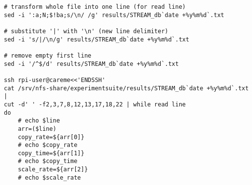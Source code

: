 \begin{verbatim}
# transform whole file into one line (for read line)                                                                                                                       
sed -i ':a;N;$!ba;s/\n/ /g' results/STREAM_db`date +%y%m%d`.txt

# substitute '|' with '\n' (new line delimiter)                                                                                                                            
sed -i 's/|/\n/g' results/STREAM_db`date +%y%m%d`.txt

# remove empty first line                                                                                                                                                  
sed -i '/^$/d' results/STREAM_db`date +%y%m%d`.txt

ssh rpi-user@careme<<'ENDSSH'                                                                                                                                               
cat /srv/nfs-share/experimentsuite/results/STREAM_db`date +%y%m%d`.txt | 
cut -d' ' -f2,3,7,8,12,13,17,18,22 | while read line                                                    
do                                                                                                                                                                          
    # echo $line                                                                                                                                                            
    arr=($line)                                                                                                                                                            
    copy_rate=${arr[0]}                                                                                                                                                     
    # echo $copy_rate                                                                                                                                                       
    copy_time=${arr[1]}                                                                                                                                                     
    # echo $copy_time                                                                                                                                                       
    scale_rate=${arr[2]}                                                                                                                                                    
    # echo $scale_rate                                                                                                                                                      

\end{verbatim}

